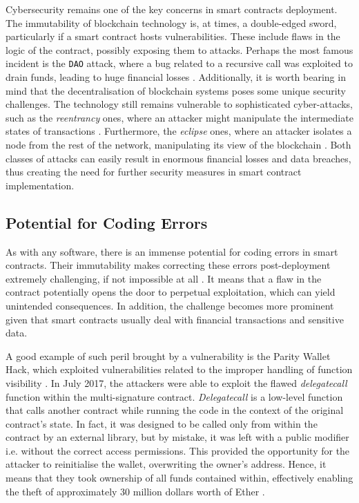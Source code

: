 Cybersecurity remains one of the key concerns in smart contracts deployment. The immutability of blockchain technology is, at times, a double-edged sword, particularly if a smart contract hosts vulnerabilities. These include flaws in the logic of the contract, possibly exposing them to attacks. Perhaps the most famous incident is the \texttt{DAO} attack, where a bug related to a recursive call was exploited to drain funds, leading to huge financial losses \cite{DamianoEtAl2019, Durovic2021, KaiEtAl2021}. Additionally, it is worth bearing in mind that the decentralisation of blockchain systems poses some unique security challenges. The technology still remains vulnerable to sophisticated cyber-attacks, such as the \textit{reentrancy} ones, where an attacker might manipulate the intermediate states of transactions \cite{KaiEtAl2021}. Furthermore, the \textit{eclipse} ones, where an attacker isolates a node from the rest of the network, manipulating its view of the blockchain \cite{KaiEtAl2021}. Both classes of attacks can easily result in enormous financial losses and data breaches, thus creating the need for further security measures in smart contract implementation.

\subsection{Potential for Coding Errors}

As with any software, there is an immense potential for coding errors in smart contracts. Their immutability makes correcting these errors post-deployment extremely challenging, if not impossible at all \cite{Durovic2021}. It means that a flaw in the contract potentially opens the door to perpetual exploitation, which can yield unintended consequences. In addition, the challenge becomes more prominent given that smart contracts usually deal with financial transactions and sensitive data. 

A good example of such peril brought by a vulnerability is the Parity Wallet Hack, which exploited vulnerabilities related to the improper handling of function visibility \cite{ZhouEtAl2022}. In July 2017, the attackers were able to exploit the flawed \textit{delegatecall} function within the multi-signature contract. \textit{Delegatecall} is a low-level function that calls another contract while running the code in the context of the original contract's state. In fact, it was designed to be called only from within the contract by an external library, but by mistake, it was left with a public modifier i.e. without the correct access permissions. This provided the opportunity for the attacker to reinitialise the wallet, overwriting the owner's address. Hence, it means that they took ownership of all funds contained within, effectively enabling the theft of approximately 30 million dollars worth of Ether \cite{ZhouEtAl2022}. 

